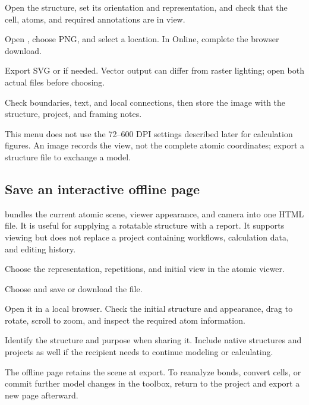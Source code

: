 \begin{steps}
\item Open the structure, set its orientation and representation, and check that the cell, atoms, and required annotations are in view.
\item Open , choose PNG, and select a location. In Online, complete the browser download.
\item Export SVG or  if needed. Vector output can differ from raster lighting; open both actual files before choosing.
\item Check boundaries, text, and local connections, then store the image with the structure, project, and framing notes.
\end{steps}

This menu does not use the 72--600 DPI settings described later for calculation figures. An image records the view, not the complete atomic coordinates; export a structure file to exchange a model.



\subsection{Save an interactive offline page}

 bundles the current atomic scene, viewer appearance, and camera into one HTML file. It is useful for supplying a rotatable structure with a report. It supports viewing but does not replace a project containing workflows, calculation data, and editing history.

\begin{steps}
\item Choose the representation, repetitions, and initial view in the atomic viewer.
\item Choose  and save or download the  file.
\item Open it in a local browser. Check the initial structure and appearance, drag to rotate, scroll to zoom, and inspect the required atom information.
\item Identify the structure and purpose when sharing it. Include native structures and projects as well if the recipient needs to continue modeling or calculating.
\end{steps}

The offline page retains the scene at export. To reanalyze bonds, convert cells, or commit further model changes in the toolbox, return to the project and export a new page afterward.

